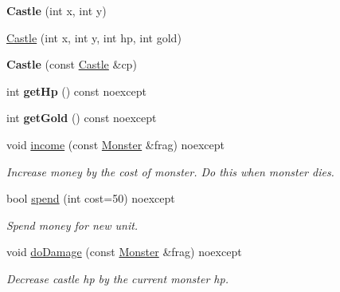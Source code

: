 \begin{DoxyCompactItemize}
\item 
\mbox{\label{classbase__structures_1_1Castle_a6ad8f2e53c46e92c50e879168095bf08}} 
{\bfseries Castle} (int x, int y)
\item 
\hyperlink{classbase__structures_1_1Castle_a88617f122b64d0f6353e6b776c538af3}{Castle} (int x, int y, int hp, int gold)
\item 
\mbox{\label{classbase__structures_1_1Castle_a678b23dd63cc223fcf3196a4a0654a95}} 
{\bfseries Castle} (const \hyperlink{classbase__structures_1_1Castle}{Castle} \&cp)
\item 
\mbox{\label{classbase__structures_1_1Castle_a9d6c9d184a239f6ef7903342426f5a42}} 
int {\bfseries get\+Hp} () const noexcept
\item 
\mbox{\label{classbase__structures_1_1Castle_a4328429909f52ff8c4c54d2d81d6a6be}} 
int {\bfseries get\+Gold} () const noexcept
\item 
\mbox{\label{classbase__structures_1_1Castle_a2d136a07841143527ffc0d44b3efd934}} 
void \hyperlink{classbase__structures_1_1Castle_a2d136a07841143527ffc0d44b3efd934}{income} (const \hyperlink{classbase__structures_1_1Monster}{Monster} \&frag) noexcept
\begin{DoxyCompactList}\small\item\em Increase money by the cost of monster. Do this when monster dies. \end{DoxyCompactList}\item 
\mbox{\label{classbase__structures_1_1Castle_a73e8c50ded6741037206c91cf2ae7567}} 
bool \hyperlink{classbase__structures_1_1Castle_a73e8c50ded6741037206c91cf2ae7567}{spend} (int cost=50) noexcept
\begin{DoxyCompactList}\small\item\em Spend money for new unit. \end{DoxyCompactList}\item 
\mbox{\label{classbase__structures_1_1Castle_a7e432078dcb5e45a69a22e5f098a2100}} 
void \hyperlink{classbase__structures_1_1Castle_a7e432078dcb5e45a69a22e5f098a2100}{do\+Damage} (const \hyperlink{classbase__structures_1_1Monster}{Monster} \&frag) noexcept
\begin{DoxyCompactList}\small\item\em Decrease castle hp by the current monster hp. \end{DoxyCompactList}\end{DoxyCompactItemize}
